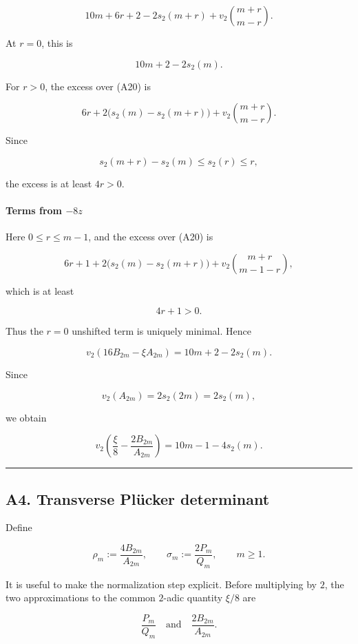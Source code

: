 \documentclass[
  10pt,
  letterpaper,
]{article}
\theoremstyle{definition}
\theoremstyle{remark}
\begin{document}
\[
10m+6r+2
-
2s_2(m+r)
+
v_2\binom{m+r}{m-r}.
\]

At \(r=0\), this is

\[
10m+2-2s_2(m).
\tag{A20}
\]

For \(r>0\), the excess over (A20) is

\[
6r
+
2\bigl(s_2(m)-s_2(m+r)\bigr)
+
v_2\binom{m+r}{m-r}.
\]

Since

\[
s_2(m+r)-s_2(m)\le s_2(r)\le r,
\]

the excess is at least \(4r>0\).

\paragraph{\texorpdfstring{Terms from
\(-8z\)}{Terms from -8z}}\label{terms-from--8z}

Here \(0\le r\le m-1\), and the excess over (A20) is

\[
6r+1
+
2\bigl(s_2(m)-s_2(m+r)\bigr)
+
v_2\binom{m+r}{m-1-r},
\]

which is at least

\[
4r+1>0.
\]

Thus the \(r=0\) unshifted term is uniquely minimal. Hence

\[
\boxed{
v_2(16B_{2m}-\xi A_{2m})
=
10m+2-2s_2(m).
}
\tag{A21}
\]

Since

\[
v_2(A_{2m})
=
2s_2(2m)
=
2s_2(m),
\]

we obtain

\[
\boxed{
v_2\!\left(
\frac{\xi}{8}
-
\frac{2B_{2m}}{A_{2m}}
\right)
=
10m-1-4s_2(m).
}
\tag{A22}
\]

\begin{center}\rule{0.5\linewidth}{0.5pt}\end{center}

\subsection{A4. Transverse Plücker
determinant}\label{a4.-transverse-pluxfccker-determinant}

Define

\[
\rho_m:=\frac{4B_{2m}}{A_{2m}},
\qquad
\sigma_m:=\frac{2P_m}{Q_m},
\qquad m\ge1.
\]

It is useful to make the normalization step explicit. Before multiplying
by \(2\), the two approximations to the common \(2\)-adic quantity
\(\xi/8\) are

\[
\frac{P_m}{Q_m}
\quad\text{and}\quad
\frac{2B_{2m}}{A_{2m}}.
\]
\end{document}
